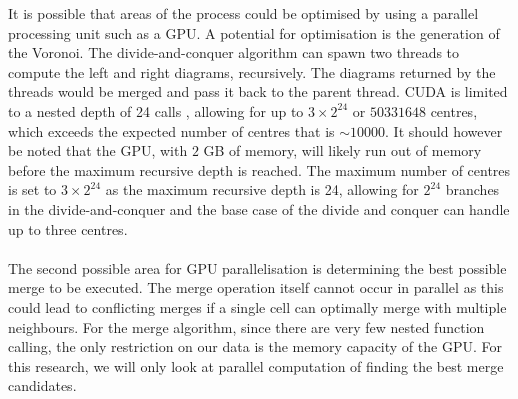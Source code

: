 It is possible that areas of the process could be optimised by using a parallel processing unit such as a GPU. A potential for optimisation is the generation of the Voronoi. The divide-and-conquer algorithm can spawn two threads to compute the left and right diagrams, recursively. The diagrams returned by the threads would be merged and pass it back to the parent thread. CUDA is limited to a nested depth of 24 calls \citep{CUDA}, allowing for up to $3 \times 2^{24}$ or $50331648$ centres, which exceeds the expected number of centres that is $\sim10000$. It should however be noted that the GPU, with $2$ GB of memory, will likely run out of memory before the maximum recursive depth is reached. The maximum number of centres is set to $3 \times 2^{24}$ as the maximum recursive depth is 24, allowing for $2^24$ branches in the divide-and-conquer and the base case of the divide and conquer can handle up to three centres.
\\
\\
The second possible area for GPU parallelisation is determining the best possible merge to be executed. The merge operation itself cannot occur in parallel as this could lead to conflicting merges if a single cell can optimally merge with multiple neighbours. For the merge algorithm, since there are very few nested function calling, the only restriction on our data is the memory capacity of the GPU. For this research, we will only look at parallel computation of finding the best merge candidates.